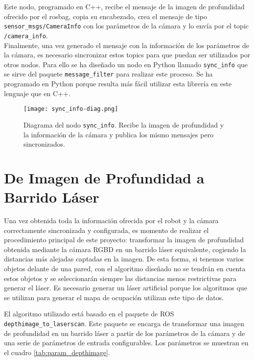 Este nodo, programado en C++, recibe el mensaje de la imagen de profundidad ofrecido por el rosbag, copia su encabezado, crea el mensaje de tipo \texttt{sensor\_msgs/\-CameraInfo} con los parámetros de la cámara y lo envía por el topic \texttt{/camera\_info}.\\

Finalmente, una vez generado el mensaje con la información de los parámetros de la cámara, es necesario sincronizar estos topics para que puedan ser utilizados por otros nodos. Para ello se ha diseñado un nodo en Python llamado \texttt{sync\_info} que se sirve del paquete \texttt{message\_filter} para realizar este proceso. Se ha programado en Python porque resulta más fácil utilizar esta librería en este lenguaje que en C++.\\

\begin{figure}[h]
	\begin{center} 
		\texttt{[image: sync\_info-diag.png]}
	\end{center}
	\caption{Diagrama del nodo \texttt{sync\_info}. Recibe la imagen de profundidad y la información de la cámara y publica los mismo mensajes pero sincronizados.}
	\label{fig:sync_info}
\end{figure}

\section{De Imagen de Profundidad a Barrido Láser} \label{depthimage_section}

Una vez obtenida toda la información ofrecida por el robot y la cámara correctamente sincronizada y configurada, es momento de realizar el procedimiento principal de este proyecto: transformar la imagen de profundidad obtenida mediante la cámara RGBD en un barrido láser equivalente, cogiendo la distancias más alejadas captadas en la imagen. De esta forma, si tenemos varios objetos delante de una pared, con el algoritmo diseñado no se tendrán en cuenta estos objetos y se seleccionarán siempre las distancias menos restrictivas para generar el láser. Es necesario generar un láser artificial porque los algoritmos que se utilizan para generar el mapa de ocupación utilizan este tipo de datos.\\


\newpage

El algoritmo utilizado está basado en el paquete de ROS \texttt{depthimage\-\_to\_\-laserscan}. Este paquete se encarga de transformar una imagen de profundidad en un barrido láser a partir de los parámetros de la cámara y de una serie de parámetros de entrada configurables. Los parámetros se muestran en el cuadro \ref{tab:param_depthimage}.


